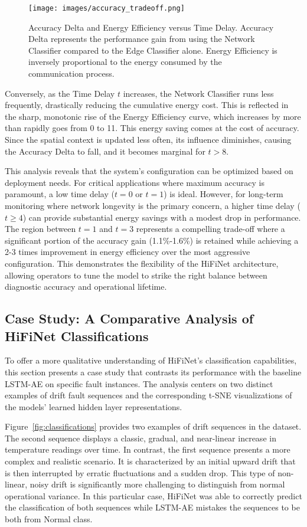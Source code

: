 \begin{figure}
  \centering
  \texttt{[image: images/accuracy\_tradeoff.png]}
  \caption{Accuracy Delta and Energy Efficiency versus Time Delay.  Accuracy Delta represents the performance gain from using the Network Classifier compared to the Edge Classifier alone. Energy Efficiency is inversely proportional to the energy consumed by the communication process.}
  \label{fig:accuracy_tradeoff}
\end{figure}

Conversely, as the Time Delay \(t\) increases, the Network Classifier runs less frequently, drastically reducing the cumulative energy cost. This is reflected in the sharp, monotonic rise of the Energy Efficiency curve, which increases by more than rapidly goes from 0 to 11. This energy saving comes at the cost of accuracy. Since the spatial context is updated less often, its influence diminishes, causing the Accuracy Delta to fall,  and it becomes marginal for \(t > 8\).

This analysis reveals that the system's configuration can be optimized based on deployment needs. For critical applications where maximum accuracy is paramount, a low time delay (\(t=0\) or \(t=1\)) is ideal. However, for long-term monitoring where network longevity is the primary concern, a higher time delay (\(t\ge4\)) can provide substantial energy savings with a modest drop in performance. The region between \(t=1\) and \(t=3\) represents a compelling trade-off where a significant portion of the accuracy gain (1.1\%-1.6\%) is retained while achieving a 2-3 times improvement in energy efficiency over the most aggressive configuration. This demonstrates the flexibility of the HiFiNet architecture, allowing operators to tune the model to strike the right balance between diagnostic accuracy and operational lifetime.

\subsection{Case Study: A Comparative Analysis of HiFiNet Classifications}
\label{case:classification}
To offer a more qualitative understanding of HiFiNet's classification capabilities, this section presents a case study that contrasts its performance with the baseline LSTM-AE on specific fault instances. The analysis centers on two distinct examples of drift fault sequences and the corresponding t-SNE visualizations of the models' learned hidden layer representations.

Figure~\ref{fig:classifications} provides two examples of drift sequences in the dataset. The second sequence displays a classic, gradual, and near-linear increase in temperature readings over time. In contrast, the first sequence presents a more complex and realistic scenario. It is characterized by an initial upward drift that is then interrupted by erratic fluctuations and a sudden drop. This type of non-linear, noisy drift is significantly more challenging to distinguish from normal operational variance. In this particular case, HiFiNet was able to correctly predict the classification of both sequences while LSTM-AE mistakes the sequences to be both from Normal class.

